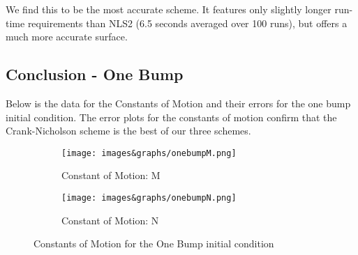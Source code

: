 \documentclass[11pt, oneside]{article}   	%
\begin{document}
We find this to be the most accurate scheme. It features only slightly longer run-time requirements than NLS2 (6.5 seconds averaged over 100 runs), but offers a much more accurate surface. 
\vspace{1.5cm}
\subsection{Conclusion - One Bump}

Below is the data for the Constants of Motion and their errors for the one bump initial condition. The error plots for the constants of motion confirm that the Crank-Nicholson scheme is the best of our three schemes.

\begin{figure}[H]
    \begin{subfigure}{0.5\textwidth}
        \centering\captionsetup{width=.85\linewidth}%
        \texttt{[image: images\&graphs/onebumpM.png]}
        \caption{Constant of Motion: M}
        \label{NLS1 Mesh}
    \end{subfigure}
    \begin{subfigure}{0.5\textwidth}
        \centering\captionsetup{width=.85\linewidth}%
        \texttt{[image: images\&graphs/onebumpN.png]}
        \caption{Constant of Motion: N}
        \label{NLS1 Constants of Motion}
    \end{subfigure}
\caption{Constants of Motion for the One Bump initial condition}
\label{fig:image2}
\end{figure}
\end{document}
